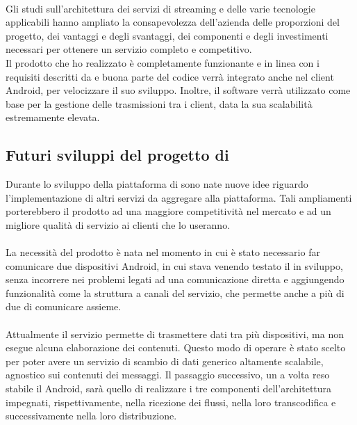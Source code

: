 \paragraph*{} Gli studi sull'architettura dei servizi di streaming e delle varie tecnologie applicabili hanno ampliato la consapevolezza dell'azienda delle proporzioni del progetto, dei vantaggi e degli svantaggi, dei componenti e degli investimenti necessari per ottenere un servizio completo e competitivo.
\\
Il prodotto che ho realizzato è completamente funzionante e in linea con i requisiti descritti da \nomeAzienda{} e buona parte del codice verrà integrato anche nel client Android, per velocizzare il suo sviluppo. Inoltre, il software verrà utilizzato come base per la gestione delle trasmissioni tra i client, data la sua scalabilità estremamente elevata.

\subsection{Futuri sviluppi del progetto di }
Durante lo sviluppo della piattaforma di  sono nate nuove idee riguardo l'implementazione di altri servizi da aggregare alla piattaforma. Tali ampliamenti porterebbero il prodotto ad una maggiore competitività nel mercato e ad un migliore qualità di servizio ai clienti che lo useranno.
\paragraph*{}
La necessità del prodotto è nata nel momento in cui è stato necessario far comunicare due dispositivi Android, in cui stava venendo testato il  in sviluppo, senza incorrere nei problemi legati ad una comunicazione diretta e aggiungendo funzionalità come la struttura a canali del servizio, che permette anche a più di due  di comunicare assieme.
\paragraph*{}
Attualmente il servizio permette di trasmettere dati tra più dispositivi, ma non esegue alcuna elaborazione dei contenuti. Questo modo di operare è stato scelto per poter avere un servizio di scambio di dati generico altamente scalabile, agnostico sui contenuti dei messaggi. Il passaggio successivo, un a volta reso stabile il  Android, sarà quello di realizzare i tre componenti dell'architettura impegnati, rispettivamente, nella ricezione dei flussi, nella loro transcodifica e successivamente nella loro distribuzione.

